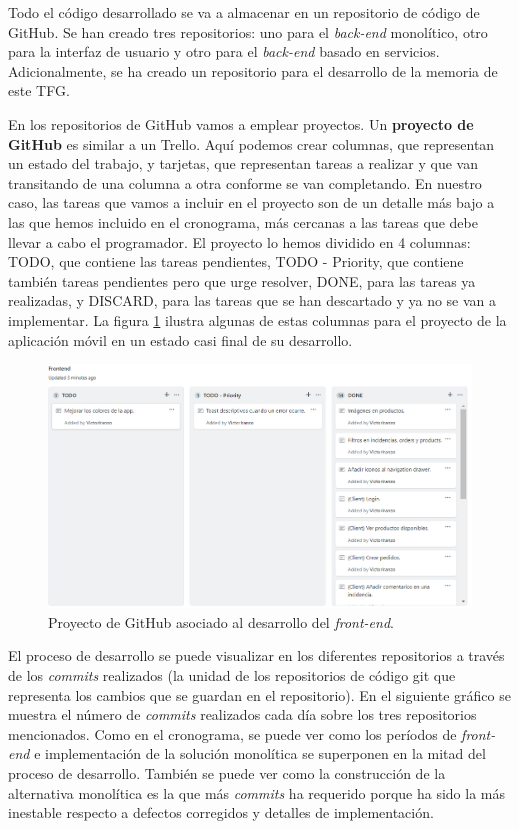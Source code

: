 \documentclass[11pt,spanish,listoffigures]{tfgetsinf}
\begin{document}
Todo el código desarrollado se va a almacenar en un repositorio de código de GitHub. Se han creado tres repositorios: uno para el \textit{back-end} monolítico, otro para la interfaz de usuario y otro para el \textit{back-end} basado en servicios. Adicionalmente, se ha creado un repositorio para el desarrollo de la memoria de este TFG.

En los repositorios de GitHub vamos a emplear proyectos. Un \textbf{proyecto de GitHub} es similar a un Trello. Aquí podemos crear columnas, que representan un estado del trabajo, y tarjetas, que representan tareas a realizar y que van transitando de una columna a otra conforme se van completando. En nuestro caso, las tareas que vamos a incluir en el proyecto son de un detalle más bajo a las que hemos incluido en el cronograma, más cercanas a las tareas que debe llevar a cabo el programador. El proyecto lo hemos dividido en 4 columnas: TODO, que contiene las tareas pendientes, TODO - Priority, que contiene también tareas pendientes pero que urge resolver, DONE, para las tareas ya realizadas, y DISCARD, para las tareas que se han descartado y ya no se van a implementar. La figura \ref{fig:GitHubProject} ilustra algunas de estas columnas para el proyecto de la aplicación móvil en un estado casi final de su desarrollo.

\begin{figure}[h]
\centering
\includegraphics[scale=0.6]{GitHubProject}
\caption{Proyecto de GitHub asociado al desarrollo del \textit{front-end}.}
\label{fig:GitHubProject}
\end{figure}

\newpage


El proceso de desarrollo se puede visualizar en los diferentes repositorios a través de los \textit{commits} realizados (la unidad de los repositorios de código git que representa los cambios que se guardan en el repositorio). En el siguiente gráfico se muestra el número de \textit{commits} realizados cada día sobre los tres repositorios mencionados. Como en el cronograma, se puede ver como los períodos de \textit{front-end} e implementación de la solución monolítica se superponen en la mitad del proceso de desarrollo. También se puede ver como la construcción de la alternativa monolítica es la que más \textit{commits} ha requerido porque ha sido la más inestable respecto a defectos corregidos y detalles de implementación.
\end{document}

